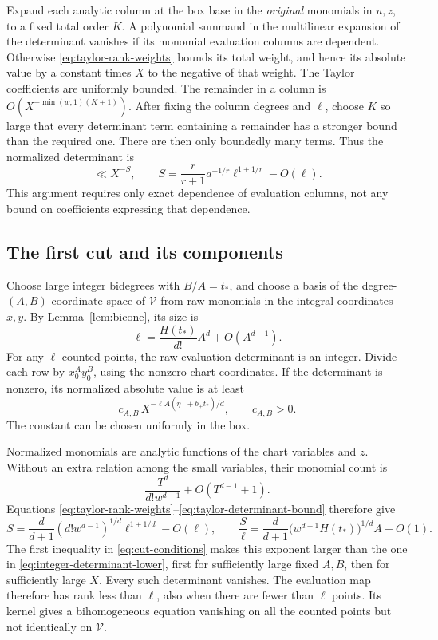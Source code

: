 Expand each analytic column at the box base in the \emph{original}
monomials in \(u,z\), to a fixed total order \(K\).
A polynomial summand in the multilinear expansion of the determinant
vanishes if its monomial evaluation columns are dependent.
Otherwise \eqref{eq:taylor-rank-weights} bounds its total weight, and
hence its absolute value by a constant times \(X\) to the negative
of that weight.  The Taylor coefficients are uniformly bounded.
The remainder in a column is
\(O(X^{-\min(w,1)(K+1)})\).
After fixing the column degrees and \(\ell\), choose \(K\) so large
that every determinant term containing a remainder has a stronger
bound than the required one.  There are then only boundedly many
terms.  Thus the normalized determinant is
\begin{equation}
 \ll X^{-S},\qquad
 S=\frac{r}{r+1}a^{-1/r}\ell^{1+1/r}-O(\ell).
 \label{eq:taylor-determinant-bound}
\end{equation}
This argument requires only exact dependence of evaluation columns,
not any bound on coefficients expressing that dependence.

\subsection{The first cut and its components}

Choose large integer bidegrees with \(B/A=t_*\), and choose a basis
of the degree-\((A,B)\) coordinate space of \(\mathcal V\) from raw
monomials in the integral coordinates \(x,y\).
By Lemma~\ref{lem:bicone}, its size is
\[
 \ell=\frac{H(t_*)}{d!}A^d+O(A^{d-1}).
\]
For any \(\ell\) counted points, the raw evaluation determinant is
an integer.  Divide each row by \(x_0^Ay_0^B\), using the nonzero
chart coordinates.  If the determinant is nonzero, its normalized
absolute value is at least
\begin{equation}
 c_{A,B}\,X^{-\ell A(\eta_++b_+t_*)/d},
 \qquad c_{A,B}>0.
 \label{eq:integer-determinant-lower}
\end{equation}
The constant can be chosen uniformly in the box.

Normalized monomials are analytic functions of the chart variables
and \(z\).  Without an extra relation among the small variables,
their monomial count is
\[
 \frac{T^d}{d!w^{d-1}}+O(T^{d-1}+1).
\]
Equations \eqref{eq:taylor-rank-weights}--\eqref{eq:taylor-determinant-bound}
therefore give
\[
 S=\frac d{d+1}(d!w^{d-1})^{1/d}\ell^{1+1/d}-O(\ell),
 \qquad
 \frac S\ell
 =\frac d{d+1}\bigl(w^{d-1}H(t_*)\bigr)^{1/d}A+O(1).
\]
The first inequality in \eqref{eq:cut-conditions} makes this exponent
larger than the one in \eqref{eq:integer-determinant-lower}, first
for sufficiently large fixed \(A,B\), then for sufficiently large
\(X\).  Every such determinant vanishes.  The evaluation map
therefore has rank less than \(\ell\), also when there are fewer
than \(\ell\) points.  Its kernel gives a bihomogeneous equation
vanishing on all the counted points but not identically on
\(\mathcal V\).

